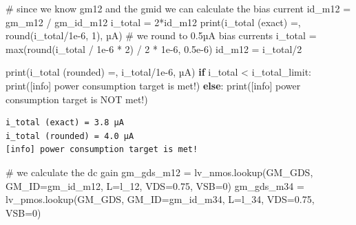 \documentclass[
  a4paper,
  DIV=11,
  numbers=noendperiod]{scrartcl}
\newenvironment{Shaded}{\begin{snugshade}}{\end{snugshade}}
\newcommand{\BuiltInTok}[1]{\textcolor[rgb]{0.00,0.23,0.31}{#1}}
\newcommand{\CommentTok}[1]{\textcolor[rgb]{0.37,0.37,0.37}{#1}}
\newcommand{\ControlFlowTok}[1]{\textcolor[rgb]{0.00,0.23,0.31}{\textbf{#1}}}
\newcommand{\DecValTok}[1]{\textcolor[rgb]{0.68,0.00,0.00}{#1}}
\newcommand{\FloatTok}[1]{\textcolor[rgb]{0.68,0.00,0.00}{#1}}
\newcommand{\NormalTok}[1]{\textcolor[rgb]{0.00,0.23,0.31}{#1}}
\newcommand{\OperatorTok}[1]{\textcolor[rgb]{0.37,0.37,0.37}{#1}}
\newcommand{\StringTok}[1]{\textcolor[rgb]{0.13,0.47,0.30}{#1}}
\begin{document}
\begin{tcolorbox}
\begin{Shaded}
\begin{Highlighting}[]
\CommentTok{\# since we know gm12 and the gmid we can calculate the bias current}
\NormalTok{id\_m12 }\OperatorTok{=}\NormalTok{ gm\_m12 }\OperatorTok{/}\NormalTok{ gm\_id\_m12}
\NormalTok{i\_total }\OperatorTok{=} \DecValTok{2}\OperatorTok{*}\NormalTok{id\_m12}
\BuiltInTok{print}\NormalTok{(}\StringTok{\textquotesingle{}i\_total (exact) =\textquotesingle{}}\NormalTok{, }\BuiltInTok{round}\NormalTok{(i\_total}\OperatorTok{/}\FloatTok{1e{-}6}\NormalTok{, }\DecValTok{1}\NormalTok{), }\StringTok{\textquotesingle{}µA\textquotesingle{}}\NormalTok{)}
\CommentTok{\# we round to 0.5µA bias currents}
\NormalTok{i\_total }\OperatorTok{=} \BuiltInTok{max}\NormalTok{(}\BuiltInTok{round}\NormalTok{(i\_total }\OperatorTok{/} \FloatTok{1e{-}6} \OperatorTok{*} \DecValTok{2}\NormalTok{) }\OperatorTok{/} \DecValTok{2} \OperatorTok{*} \FloatTok{1e{-}6}\NormalTok{, }\FloatTok{0.5e{-}6}\NormalTok{)}
\NormalTok{id\_m12 }\OperatorTok{=}\NormalTok{ i\_total}\OperatorTok{/}\DecValTok{2}

\BuiltInTok{print}\NormalTok{(}\StringTok{\textquotesingle{}i\_total (rounded) =\textquotesingle{}}\NormalTok{, i\_total}\OperatorTok{/}\FloatTok{1e{-}6}\NormalTok{, }\StringTok{\textquotesingle{}µA\textquotesingle{}}\NormalTok{)}
\ControlFlowTok{if}\NormalTok{ i\_total }\OperatorTok{\textless{}}\NormalTok{ i\_total\_limit:}
    \BuiltInTok{print}\NormalTok{(}\StringTok{\textquotesingle{}[info] power consumption target is met!\textquotesingle{}}\NormalTok{)}
\ControlFlowTok{else}\NormalTok{:}
    \BuiltInTok{print}\NormalTok{(}\StringTok{\textquotesingle{}[info] power consumption target is NOT met!\textquotesingle{}}\NormalTok{) }
\end{Highlighting}
\end{Shaded}

\begin{verbatim}
i_total (exact) = 3.8 µA
i_total (rounded) = 4.0 µA
[info] power consumption target is met!
\end{verbatim}

\begin{Shaded}
\begin{Highlighting}[]
\CommentTok{\# we calculate the dc gain}
\NormalTok{gm\_gds\_m12 }\OperatorTok{=}\NormalTok{ lv\_nmos.lookup(}\StringTok{\textquotesingle{}GM\_GDS\textquotesingle{}}\NormalTok{, GM\_ID}\OperatorTok{=}\NormalTok{gm\_id\_m12, L}\OperatorTok{=}\NormalTok{l\_12, VDS}\OperatorTok{=}\FloatTok{0.75}\NormalTok{, VSB}\OperatorTok{=}\DecValTok{0}\NormalTok{)}
\NormalTok{gm\_gds\_m34 }\OperatorTok{=}\NormalTok{ lv\_pmos.lookup(}\StringTok{\textquotesingle{}GM\_GDS\textquotesingle{}}\NormalTok{, GM\_ID}\OperatorTok{=}\NormalTok{gm\_id\_m34, L}\OperatorTok{=}\NormalTok{l\_34, VDS}\OperatorTok{=}\FloatTok{0.75}\NormalTok{, VSB}\OperatorTok{=}\DecValTok{0}\NormalTok{)}


\end{Highlighting}
\end{Shaded}
\end{tcolorbox}
\end{document}
